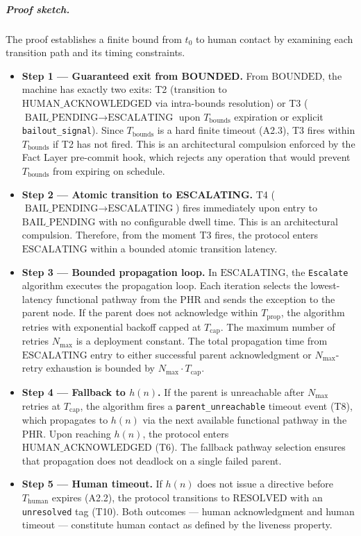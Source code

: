 \subparagraph{Proof sketch.} The proof establishes a finite bound from $t_0$ to human contact by examining each transition path and its timing constraints.

\begin{itemize}
\item \textbf{Step 1 — Guaranteed exit from BOUNDED.} From $\text{BOUNDED}$, the machine has exactly two exits: T2 (transition to $\text{HUMAN\_ACKNOWLEDGED}$ via intra-bounds resolution) or T3 ($\text{BAIL\_PENDING} \rightarrow \text{ESCALATING}$ upon $T_{\text{bounds}}$ expiration or explicit \texttt{bailout\_signal}). Since $T_{\text{bounds}}$ is a hard finite timeout (A2.3), T3 fires within $T_{\text{bounds}}$ if T2 has not fired. This is an architectural compulsion enforced by the Fact Layer pre-commit hook, which rejects any operation that would prevent $T_{\text{bounds}}$ from expiring on schedule.

\item \textbf{Step 2 — Atomic transition to ESCALATING.} T4 ($\text{BAIL\_PENDING} \rightarrow \text{ESCALATING}$) fires immediately upon entry to $\text{BAIL\_PENDING}$ with no configurable dwell time. This is an architectural compulsion. Therefore, from the moment T3 fires, the protocol enters $\text{ESCALATING}$ within a bounded atomic transition latency.

\item \textbf{Step 3 — Bounded propagation loop.} In $\text{ESCALATING}$, the \texttt{Escalate} algorithm executes the propagation loop. Each iteration selects the lowest-latency functional pathway from the PHR and sends the exception to the parent node. If the parent does not acknowledge within $T_{\text{prop}}$, the algorithm retries with exponential backoff capped at $T_{\text{cap}}$. The maximum number of retries $N_{\max}$ is a deployment constant. The total propagation time from $\text{ESCALATING}$ entry to either successful parent acknowledgment or $N_{\max}$-retry exhaustion is bounded by $N_{\max} \cdot T_{\text{cap}}$.

\item \textbf{Step 4 — Fallback to $h(n)$.} If the parent is unreachable after $N_{\max}$ retries at $T_{\text{cap}}$, the algorithm fires a \texttt{parent\_unreachable} timeout event (T8), which propagates to $h(n)$ via the next available functional pathway in the PHR. Upon reaching $h(n)$, the protocol enters $\text{HUMAN\_ACKNOWLEDGED}$ (T6). The fallback pathway selection ensures that propagation does not deadlock on a single failed parent.

\item \textbf{Step 5 — Human timeout.} If $h(n)$ does not issue a directive before $T_{\text{human}}$ expires (A2.2), the protocol transitions to $\text{RESOLVED}$ with an \texttt{unresolved} tag (T10). Both outcomes — human acknowledgment and human timeout — constitute human contact as defined by the liveness property.
\end{itemize}

